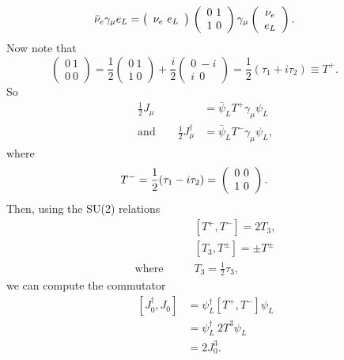\[ \bar{\nu}_e\gamma_\mu e_L= \left( \begin{array}{c}
\nu_e \ e_L   \end{array} \right)
  \\ \left( \begin{array}{cc}
 0 \ 1 \\
1 \ 0   \end{array} \right)\gamma_\mu \\ 
\left( \begin{array}{cc}
 \nu_e \\
e_L   \end{array} \right). \qquad\] 
Now note that 
\[ \left( \begin{array}{cc}
 0 \ 1 \\
0 \ 0   \end{array} \right) = \frac{1}{2} 
\left( \begin{array}{cc}
 0 \ 1 \\
1 \ 0   \end{array} \right) + \frac{i}{2}
\left( \begin{array}{cc}
 0 \ -i \\
i \ \ 0   \end{array} \right) = \frac{1}{2}(\tau_1 + i\tau_2) \equiv T^+.
\qquad\] 
So
\begin{equation}
\begin{split}
\frac{1}{2}J_\mu &= \bar{\psi}_L T^+ \gamma_\mu \psi_L \\
\text{and} \qquad \frac{1}{2}J_\mu^\dagger &= \bar{\psi}_L T^- \gamma_\mu \psi_L,
\end{split}
\end{equation}
where 
\[ T^- = \frac{1}{2}(\tau_1 - i\tau_2) =
  \\ \left( \begin{array}{cc}
 0 \ 0 \\
1 \ 0   \end{array} \right). \qquad\]
Then, using the SU(2) relations
\begin{equation}
\begin{split}
&[T^+,T^-] = 2T_3, \\
&[T_3, T^\pm] = \pm T^\pm \\
\text{where} \qquad &T_3 = \frac{1}{2}\tau_3,
\end{split}
\end{equation}
we can compute the commutator
\begin{equation}
\begin{split}
[J_0^\dagger, J_0] &= \psi_L^\dagger[T^+,T^-]\psi_L \\
&=\psi_L^\dagger \ 2T^3 \psi_L \\
&= 2J_0^3.
\end{split}
\end{equation}
